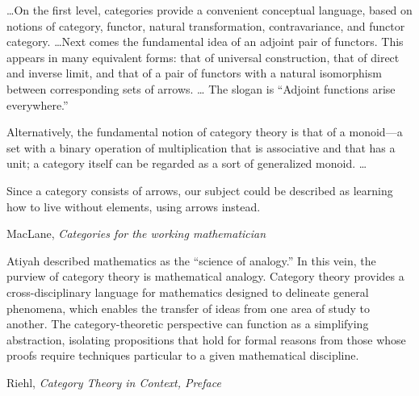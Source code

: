 \documentclass[11pt]{book}
\begin{document}
\pagebreak
\epigraph{\ldots On the first level, categories provide
a convenient conceptual language, based on notions of category, 
functor, natural transformation, contravariance, and
functor category.
\ldots Next comes the fundamental idea of an adjoint pair of functors.
This appears in many equivalent forms: that of universal construction,
that of direct and inverse limit, 
and that of a pair of functors with a natural isomorphism between
corresponding sets of arrows. \ldots
The slogan is ``Adjoint functions arise everywhere.''
\par
Alternatively, the fundamental notion of category theory is that
of a monoid---a set with a binary operation of multiplication
that is associative and that has a unit;
a category itself can be regarded as a sort of generalized monoid.
\ldots
\par
Since a category consists of arrows, our subject could be 
described as learning how to live without elements, using arrows
instead.
}
{MacLane, \textit{Categories for the working
mathematician}~\cite{maclane_1998_cat_for_working_mathematician}}

\epigraph{Atiyah described mathematics as the
``science of analogy.'' In this vein, the purview
of category theory is mathematical analogy. 
Category theory provides a cross-disciplinary
language for mathematics designed to delineate general phenomena,
which enables the
transfer of ideas from one area of study to another. 
The category-theoretic perspective can
function as a simplifying abstraction, isolating propositions 
that hold for formal reasons
from those whose proofs require techniques particular 
to a given mathematical discipline.}
{Riehl, 
\textit{Category Theory in Context, Preface
}~\cite{riehl_2017_cath_in_context}}
\end{document}
